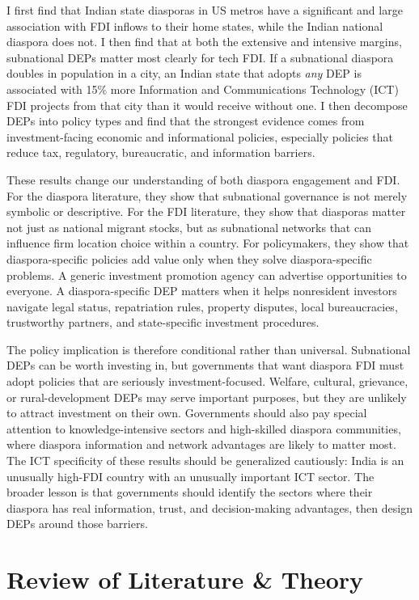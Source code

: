 \documentclass[doublespace,nopageskip]{UVAthesis}
\begin{document}
I first find that Indian state diasporas in US metros have a significant and large association with FDI inflows to their home states, while the Indian national diaspora does not. I then find that at both the extensive and intensive margins, subnational DEPs matter most clearly for tech FDI. If a subnational diaspora doubles in population in a city, an Indian state that adopts \textit{any} DEP is associated with 15\% more Information and Communications Technology (ICT) FDI projects from that city than it would receive without one. I then decompose DEPs into policy types and find that the strongest evidence comes from investment-facing economic and informational policies, especially policies that reduce tax, regulatory, bureaucratic, and information barriers.

These results change our understanding of both diaspora engagement and FDI. For the diaspora literature, they show that subnational governance is not merely symbolic or descriptive. For the FDI literature, they show that diasporas matter not just as national migrant stocks, but as subnational networks that can influence firm location choice within a country. For policymakers, they show that diaspora-specific policies add value only when they solve diaspora-specific problems. A generic investment promotion agency can advertise opportunities to everyone. A diaspora-specific DEP matters when it helps nonresident investors navigate legal status, repatriation rules, property disputes, local bureaucracies, trustworthy partners, and state-specific investment procedures.

The policy implication is therefore conditional rather than universal. Subnational DEPs can be worth investing in, but governments that want diaspora FDI must adopt policies that are seriously investment-focused. Welfare, cultural, grievance, or rural-development DEPs may serve important purposes, but they are unlikely to attract investment on their own. Governments should also pay special attention to knowledge-intensive sectors and high-skilled diaspora communities, where diaspora information and network advantages are likely to matter most. The ICT specificity of these results should be generalized cautiously: India is an unusually high-FDI country with an unusually important ICT sector. The broader lesson is that governments should identify the sectors where their diaspora has real information, trust, and decision-making advantages, then design DEPs around those barriers.

\chapter{Review of Literature \& Theory} \label{se:litreview}
\end{document}
